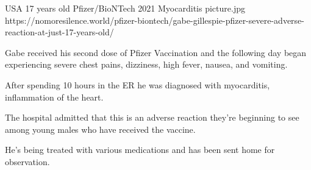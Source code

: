 {USA}
{17 years old}
{Pfizer/BioNTech}
{2021}
{Myocarditis}
{picture.jpg}
{https://nomoresilence.world/pfizer-biontech/gabe-gillespie-pfizer-severe-adverse-reaction-at-just-17-years-old/}
{

Gabe received his second dose of Pfizer Vaccination and the following day began
experiencing severe chest pains, dizziness, high fever, nausea, and vomiting.

After spending 10 hours in the ER he was diagnosed with myocarditis,
inflammation of the heart.

The hospital admitted that this is an adverse reaction they’re beginning to see
among young males who have received the vaccine.

He’s being treated with various medications and has been sent home for
observation.

}
